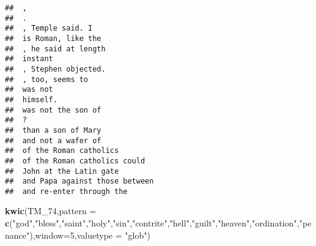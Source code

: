 \documentclass[]{article}
\newenvironment{Shaded}{\begin{snugshade}}{\end{snugshade}}
\newcommand{\KeywordTok}[1]{\textcolor[rgb]{0.13,0.29,0.53}{\textbf{#1}}}
\newcommand{\DataTypeTok}[1]{\textcolor[rgb]{0.13,0.29,0.53}{#1}}
\newcommand{\DecValTok}[1]{\textcolor[rgb]{0.00,0.00,0.81}{#1}}
\newcommand{\StringTok}[1]{\textcolor[rgb]{0.31,0.60,0.02}{#1}}
\newcommand{\NormalTok}[1]{#1}
\begin{document}
\begin{verbatim}
##  ,                                       
##  .                                       
##  , Temple said. I                        
##  is Roman, like the                      
##  , he said at length                     
##  instant                                 
##  , Stephen objected.                     
##  , too, seems to                         
##  was not                                 
##  himself.                                
##  was not the son of                      
##  ?                                       
##  than a son of Mary                      
##  and not a wafer of                      
##  of the Roman catholics                  
##  of the Roman catholics could            
##  John at the Latin gate                  
##  and Papa against those between          
##  and re-enter through the
\end{verbatim}

\begin{Shaded}
\begin{Highlighting}[]
\KeywordTok{kwic}\NormalTok{(TM_}\DecValTok{74}\NormalTok{,}\DataTypeTok{pattern =} \KeywordTok{c}\NormalTok{(}\StringTok{"god"}\NormalTok{,}\StringTok{"bless"}\NormalTok{,}\StringTok{"saint"}\NormalTok{,}\StringTok{"holy"}\NormalTok{,}\StringTok{"sin"}\NormalTok{,}\StringTok{"contrite"}\NormalTok{,}\StringTok{"hell"}\NormalTok{,}\StringTok{"guilt"}\NormalTok{,}\StringTok{"heaven"}\NormalTok{,}\StringTok{"ordination"}\NormalTok{,}\StringTok{"penance"}\NormalTok{),}\DataTypeTok{window=}\DecValTok{5}\NormalTok{,}\DataTypeTok{valuetype =} \StringTok{"glob"}\NormalTok{)}
\end{Highlighting}
\end{Shaded}
\end{document}
